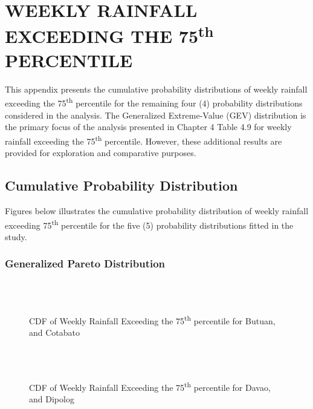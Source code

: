 \chapter{WEEKLY RAINFALL EXCEEDING THE 75\texorpdfstring{\textsuperscript{th}}{th} PERCENTILE}

This appendix presents the cumulative probability distributions of weekly rainfall exceeding the 75\textsuperscript{th} percentile for the remaining four (4) probability distributions considered in the analysis. The Generalized Extreme-Value (GEV) distribution is the primary focus of the analysis presented in Chapter 4 Table 4.9 for weekly rainfall exceeding the 75\textsuperscript{th} percentile. However, these additional results are provided for exploration and comparative purposes.

\section{Cumulative Probability Distribution}
Figures below illustrates the cumulative probability distribution of weekly rainfall exceeding 75\textsuperscript{th} percentile for the five (5) probability distributions fitted in the study.

\subsection{Generalized Pareto Distribution}

\begin{figure}[H]
  \centering
  \\
  \\
\caption{CDF of Weekly Rainfall Exceeding the 75\textsuperscript{th} percentile for Butuan, and Cotabato}
  \label{fig:weekly_0.75_appendix_gpd_pt1}
\end{figure}

\begin{figure}[H]
  \centering  
  \\
  \\
\caption{CDF of Weekly Rainfall Exceeding the 75\textsuperscript{th} percentile for Davao, and Dipolog}
  \label{fig:weekly_0.75_appendix_gpd_pt2}
\end{figure}


